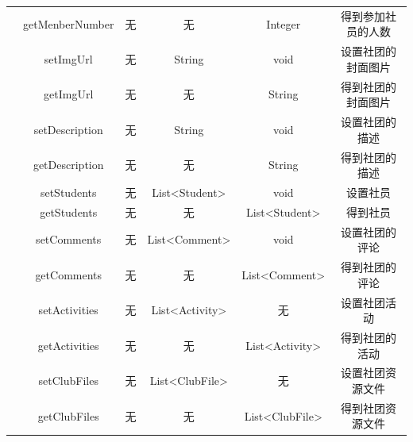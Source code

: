\documentclass[UTF8]{ctexart}
\begin{document}
\begin{table}[H]
\begin{tabular}{|c|c|c|c|c|c|}
&getMenberNumber & 无 & 无 & Integer & 得到参加社员的人数\\
&setImgUrl & 无 & String & void & 设置社团的封面图片\\
&getImgUrl & 无 & 无 & String & 得到社团的封面图片\\
&setDescription & 无 & String & void & 设置社团的描述\\
&getDescription & 无 & 无 & String & 得到社团的描述\\
&setStudents & 无 & List<Student> & void & 设置社员\\
&getStudents & 无 & 无 & List<Student> & 得到社员\\
&setComments & 无 & List<Comment> & void & 设置社团的评论\\
&getComments & 无 & 无 & List<Comment> & 得到社团的评论\\
&setActivities & 无 & List<Activity> & 无 & 设置社团活动\\
&getActivities & 无 & 无 & List<Activity> & 得到社团的活动\\
&setClubFiles & 无 & List<ClubFile> & 无 & 设置社团资源文件\\
&getClubFiles & 无 & 无 & List<ClubFile> & 得到社团资源文件\\
\hline
\end{tabular}
\end{table}
\end{document}
